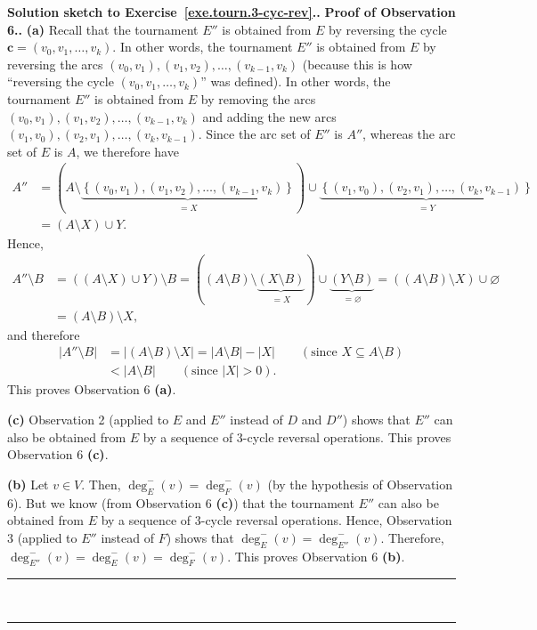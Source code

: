 \documentclass[numbers=enddot,12pt,final,onecolumn,notitlepage]{scrartcl}%
\theoremstyle{definition}
\newenvironment{proof}[1][Proof]{\noindent\textbf{#1.} }{\ \rule{0.5em}{0.5em}}
\newcommand{\set}[1]{\left\{ #1 \right\}}
\newcommand{\abs}[1]{\left| #1 \right|}
\newcommand{\tup}[1]{\left( #1 \right)}
\newcommand{\underbrack}[2]{\underbrace{#1}_{\substack{#2}}}
\begin{document}
\begin{proof}[Solution sketch to Exercise~\ref{exe.tourn.3-cyc-rev}.]
\begin{proof}[Proof of Observation 6.]
\textbf{(a)} Recall that the tournament $E''$ is obtained
from $E$ by reversing the cycle
$\mathbf{c} = \tup{v_0, v_1, \ldots, v_k}$. In other words, the
tournament $E''$ is obtained from $E$ by reversing the arcs
$\tup{v_0, v_1}, \tup{v_1, v_2}, \ldots, \tup{v_{k-1}, v_k}$
(because this is how ``reversing the cycle
$\tup{v_0, v_1, \ldots, v_k}$'' was defined). In other words, the
tournament $E''$ is obtained from $E$ by removing the arcs
$\tup{v_0, v_1}, \tup{v_1, v_2}, \ldots, \tup{v_{k-1}, v_k}$
and adding the new arcs
$\tup{v_1, v_0}, \tup{v_2, v_1}, \ldots, \tup{v_k, v_{k-1}}$.
Since the arc set of $E''$ is $A''$, whereas the arc set of $E$
is $A$, we therefore have
\begin{align*}
A''
&= \tup{A \setminus
   \underbrack{\set{\tup{v_0, v_1}, \tup{v_1, v_2},
                    \ldots, \tup{v_{k-1}, v_k}}}
              {= X}}
   \cup
   \underbrack{\set{\tup{v_1, v_0}, \tup{v_2, v_1},
                    \ldots, \tup{v_k, v_{k-1}}}}
              {= Y} \\
&= \tup{A \setminus X} \cup Y .
\end{align*}
Hence,
\begin{align*}
A'' \setminus B
&= \tup{\tup{A \setminus X} \cup Y} \setminus B
= \tup{\tup{A \setminus B} \setminus
  \underbrack{\tup{X \setminus B}}{= X}} \cup
  \underbrack{\tup{Y \setminus B}}{= \varnothing}
= \tup{\tup{A \setminus B} \setminus X} \cup \varnothing \\
&= \tup{A \setminus B} \setminus X,
\end{align*}
and therefore
\begin{align*}
\abs{A'' \setminus B}
&= \abs{\tup{A \setminus B} \setminus X}
= \abs{A \setminus B} - \abs{X}
\qquad \left(\text{since } X \subseteq A \setminus B \right) \\
&< \abs{A \setminus B}
\qquad \left(\text{since } \abs{X} > 0\right) .
\end{align*}
This proves Observation 6 \textbf{(a)}.

\textbf{(c)} Observation 2 (applied to $E$ and $E''$ instead of
$D$ and $D''$) shows that $E''$ can also be obtained
from $E$ by a sequence of $3$-cycle reversal
operations. This proves Observation 6 \textbf{(c)}.

\textbf{(b)} Let $v \in V$.
Then, $\deg^-_E \tup{v} = \deg^-_F \tup{v}$ (by the hypothesis
of Observation 6). But we know (from Observation 6 \textbf{(c)})
that the tournament $E''$ can also be obtained
from $E$ by a sequence of $3$-cycle reversal operations. Hence,
Observation 3 (applied to $E''$ instead of $F$) shows that
$\deg^-_E \tup{v} = \deg^-_{E''} \tup{v}$. Therefore,
$\deg^-_{E''} \tup{v} = \deg^-_E \tup{v} = \deg^-_F \tup{v}$.
This proves Observation 6 \textbf{(b)}.
\end{proof}


\end{proof}
\end{document}
